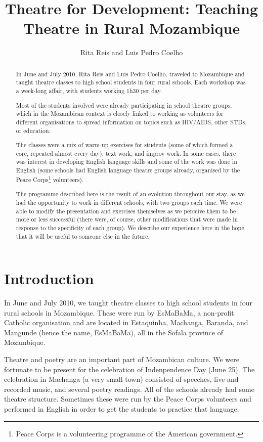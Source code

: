 \documentclass[article,twocolumn,twoside]{memoir}
\title{Theatre for Development: Teaching Theatre in Rural Mozambique}
\author{Rita Reis and Luis Pedro Coelho}
\begin{document}
\maketitle

\begin{abstract}
In June and July 2010, Rita Reis and Luis Pedro Coelho, traveled to Mozambique
and taught theatre classes to high school students in four rural schools. Each
workshop was a week-long affair, with students working 1h30 per day.

Most of the students involved were already participating in school theatre
groups, which in the Mozambican context is closely linked to working as
volunteers for different organisations to spread information on topics such as
HIV/AIDS, other STDs, or education.

The classes were a mix of warm-up exercises for students (some of which formed
a core, repeated almost every day); text work, and improv work. In some cases,
there was interest in developing English language skills and some of the work
was done in English (some schools had English language theatre groups already,
organised by the Peace Corps\footnote{Peace Corps is a volunteering programme
of the American government.} volunteers).

The programme described here is the result of an evolution throughout our stay,
as we had the opportunity to work in different schools, with two groups each
time. We were able to modify the presentation and exercises themselves as we
perceive them to be more or less successful (there were, of course, other
modifications that were made in response to the specificity of each group). We
describe our experience here in the hope that it will be useful to someone else
in the future.

\end{abstract}

\chapter{Introduction}
In June and July 2010, we taught theatre classes to high school students in
four rural schools in Mozambique. These were run by EsMaBaMa, a non-profit
Catholic organisation and are located in Estaquinha, Machanga, Baranda, and
Mangunde (hence the name, EsMaBaMa), all in the Sofala province of Mozambique.

Theatre and poetry are an important part of Mozambican culture. We were
fortunate to be present for the celebration of Indenpendence Day
(June 25). The celebration in Machanga (a very small town) consisted of
speeches, live and recorded music, and several poetry readings. All of the
schools already had some theatre structure. Sometimes these were run by the
Peace Corps volunteers and performed in English in order to get the students to
practice that language.
\end{document}
